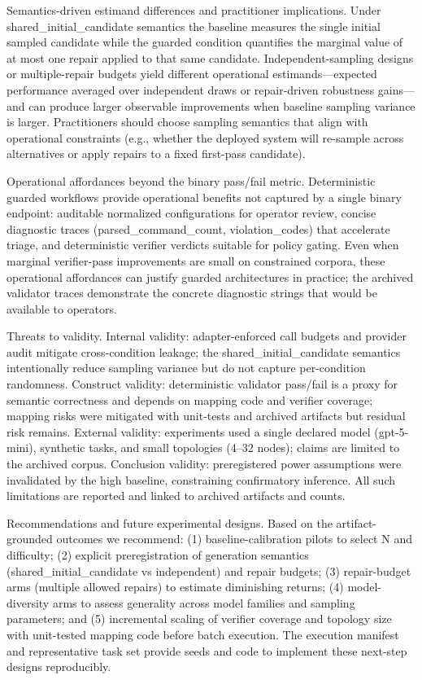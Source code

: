 \documentclass[conference]{IEEEtran}
\begin{document}
Semantics-driven estimand differences and practitioner implications. Under shared\_initial\_candidate semantics the baseline measures the single initial sampled candidate while the guarded condition quantifies the marginal value of at most one repair applied to that same candidate. Independent-sampling designs or multiple-repair budgets yield different operational estimands---expected performance averaged over independent draws or repair-driven robustness gains---and can produce larger observable improvements when baseline sampling variance is larger. Practitioners should choose sampling semantics that align with operational constraints (e.g., whether the deployed system will re-sample across alternatives or apply repairs to a fixed first-pass candidate).

Operational affordances beyond the binary pass/fail metric. Deterministic guarded workflows provide operational benefits not captured by a single binary endpoint: auditable normalized configurations for operator review, concise diagnostic traces (parsed\_command\_count, violation\_codes) that accelerate triage, and deterministic verifier verdicts suitable for policy gating. Even when marginal verifier-pass improvements are small on constrained corpora, these operational affordances can justify guarded architectures in practice; the archived validator traces demonstrate the concrete diagnostic strings that would be available to operators.

Threats to validity. Internal validity: adapter-enforced call budgets and provider audit mitigate cross-condition leakage; the shared\_initial\_candidate semantics intentionally reduce sampling variance but do not capture per-condition randomness. Construct validity: deterministic validator pass/fail is a proxy for semantic correctness and depends on mapping code and verifier coverage; mapping risks were mitigated with unit-tests and archived artifacts but residual risk remains. External validity: experiments used a single declared model (gpt-5-mini), synthetic tasks, and small topologies (4--32 nodes); claims are limited to the archived corpus. Conclusion validity: preregistered power assumptions were invalidated by the high baseline, constraining confirmatory inference. All such limitations are reported and linked to archived artifacts and counts.

Recommendations and future experimental designs. Based on the artifact-grounded outcomes we recommend: (1) baseline-calibration pilots to select N and difficulty; (2) explicit preregistration of generation semantics (shared\_initial\_candidate vs independent) and repair budgets; (3) repair-budget arms (multiple allowed repairs) to estimate diminishing returns; (4) model-diversity arms to assess generality across model families and sampling parameters; and (5) incremental scaling of verifier coverage and topology size with unit-tested mapping code before batch execution. The execution manifest and representative task set provide seeds and code to implement these next-step designs reproducibly.
\end{document}
